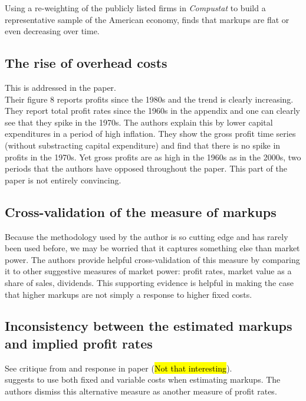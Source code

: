 \documentclass{amsart}
\theoremstyle{definition}
\theoremstyle{remark}
\numberwithin{equation}{section}
\begin{document}
Using a re-weighting of the publicly listed firms in \textit{Compustat} to build a representative sample of the American economy, \cite{traina2018aggregate} finds that markups are flat or even decreasing over time.\\

\subsection*{The rise of overhead costs} This is addressed in the paper.\\

Their figure 8 reports profits since the 1980s and the trend is clearly increasing. They report total profit rates since the 1960s in the appendix and one can clearly see that they spike in the 1970s. The authors explain this by lower capital expenditures in a period of high inflation. They show the gross profit time series (without substracting capital expenditure) and find that there is no spike in profits in the 1970s. Yet gross profits are as high in the 1960s as in the 2000s, two periods that the authors have opposed throughout the paper. This part of the paper is not entirely convincing.\\

\subsection{Cross-validation of the measure of markups} Because the methodology used by the author is so cutting edge and has rarely been used before, we may be worried that it captures something else than market power. The authors provide helpful cross-validation of this measure by comparing it to other suggestive measures of market power: profit rates, market value as a share of sales, dividends. This supporting evidence is helpful in making the case that higher markups are not simply a response to higher fixed costs.\\

\subsection*{Inconsistency between the estimated markups and implied profit rates} See critique from \cite{basu2019price} and response in paper (\hl{Not that interesting}).\\

\cite{traina2018aggregate} suggests to use both fixed and variable costs when estimating markups. The authors dismiss this alternative measure as another measure of profit rates.\\
\end{document}

